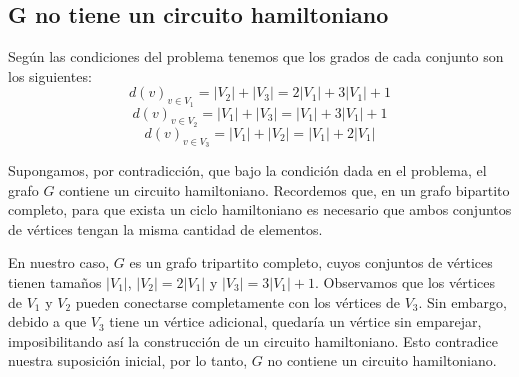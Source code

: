 \documentclass{article}
\begin{document}
	\subsection{G no tiene un circuito hamiltoniano}
	Según las condiciones del problema tenemos que los grados de cada conjunto son los siguientes: 
	$$ d(v)_{v \in V_1} = |V_2| + |V_3| = 2|V_1| + 3|V_1| + 1$$
	$$ d(v)_{v \in V_2} = |V_1| + |V_3| = |V_1| + 3|V_1| +1 $$
	$$ d(v)_{v \in V_3} = |V_1| + |V_2| = |V_1| + 2|V_1| $$
	
	Supongamos, por contradicción, que bajo la condición dada en el problema, el grafo \( G \) contiene un circuito hamiltoniano. Recordemos que, en un grafo bipartito completo, para que exista un ciclo hamiltoniano es necesario que ambos conjuntos de vértices tengan la misma cantidad de elementos.
	
	En nuestro caso, \( G \) es un grafo tripartito completo, cuyos conjuntos de vértices tienen tamaños \( |V_1| \), \( |V_2| = 2|V_1| \) y \( |V_3| = 3|V_1| + 1 \). Observamos que los vértices de \( V_1 \) y \( V_2 \) pueden conectarse completamente con los vértices de \( V_3 \). Sin embargo, debido a que \( V_3 \) tiene un vértice adicional, quedaría un vértice sin emparejar, imposibilitando así la construcción de un circuito hamiltoniano. Esto contradice nuestra suposición inicial, por lo tanto, \( G \) no contiene un circuito hamiltoniano.
	
\end{document}
